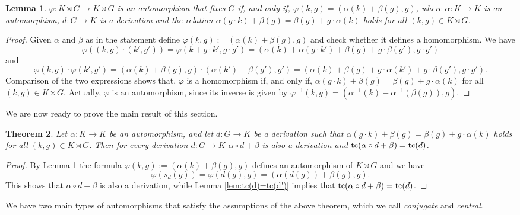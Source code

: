 \documentclass[11pt]{amsart}
\theoremstyle{plain}
\newtheorem{theorem}{Theorem}[section]
\newtheorem{lemma}[theorem]{Lemma}
\theoremstyle{definition}
\newcommand{\tc}{\mathop{\rm tc}\nolimits}
\begin{document}
\begin{lemma}\label{lem:phi=alpha+beta}
$\varphi\colon K\rtimes G\to K\rtimes G$ is an automorphism that fixes $G$ if, and only if, 
$\varphi(k,g)=(\alpha(k)+\beta(g),g)$, where $\alpha\colon K\to K$ is an automorphism, 
$d\colon G\to K$ is a derivation and the relation $\alpha(g\cdot k)+\beta(g)=\beta(g)+g\cdot\alpha(k)$
holds for all $(k,g)\in K\rtimes G$.
\end{lemma}
\begin{proof}
Given $\alpha$ and $\beta$ as in the statement define $\varphi(k,g):=(\alpha(k)+\beta(g),g)$ and check
whether it defines a homomorphism. We have
$$\varphi((k,g)\cdot(k',g'))=\varphi(k+g\cdot k',g\cdot g')=
(\alpha(k)+\alpha(g\cdot k')+\beta(g)+g\cdot \beta(g'),g\cdot g')$$
and 
$$\varphi(k,g)\cdot\varphi(k',g')=(\alpha(k)+\beta(g),g)\cdot(\alpha(k')+\beta(g'),g')=
(\alpha(k)+\beta(g)+g\cdot \alpha(k')+g\cdot \beta(g'),g\cdot g').
$$
Comparison of the two expressions shows that, $\varphi$ is a homomorphism if, and only if, 
$\alpha(g\cdot k)+\beta(g)=\beta(g)+g\cdot\alpha(k)$ for all $(k,g)\in K\rtimes G$. Actually, 
$\varphi$ is an automorphism, since its inverse is given by 
$\varphi^{-1}(k,g)=(\alpha^{-1}(k)- \alpha^{-1}(\beta(g)),g).$
\end{proof}

We are now ready to prove the main result of this section.

\begin{theorem}\label{thm:tc(d)=tc(ad+b)}
Let $\alpha\colon K\to K$ be an automorphism, and let $d\colon G\to K$ be a derivation such that 
$\alpha(g\cdot k)+\beta(g)=\beta(g)+g\cdot\alpha(k)$ holds for all $(k,g)\in K\rtimes G$.   
Then for every derivation $d\colon G\to K$ $\alpha\circ d+\beta$ is also a derivation and 
$\tc(\alpha\circ d+\beta)=\tc(d)$.
\end{theorem}
\begin{proof}
By Lemma \ref{lem:phi=alpha+beta}  the formula $\varphi(k,g):=(\alpha(k)+\beta(g),g)$ defines 
an automorphism of $K\rtimes G$ and we have
$$\varphi(s_d(g))=\varphi(d(g),g)=(\alpha(d(g))+\beta(g),g).$$
This shows that $\alpha\circ d+\beta$ is also a derivation, while Lemma \ref{lem:tc(d)=tc(d')} implies that 
$\tc(\alpha\circ d+\beta)=\tc(d)$.
\end{proof}

We have two main types of automorphisms that satisfy the assumptions of the above theorem, which
we call \emph{conjugate} and \emph{central}.
\end{document}
